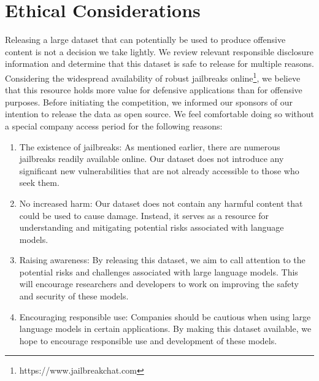 \section*{Ethical Considerations}
 \label{sec:ethics}
Releasing a large dataset that can potentially be used to produce offensive content is not a decision we take lightly. We review relevant responsible disclosure information \cite{kirichenko2020best, cencini2005software} and determine that this dataset is safe to release for multiple reasons. Considering the widespread availability of robust jailbreaks online\footnote{https://www.jailbreakchat.com}, we believe that this resource holds more value for defensive applications than for offensive purposes. Before initiating the competition, we informed our sponsors of our intention to release the data as open source. We feel comfortable doing so without a special company access period for the following reasons:
\begin{enumerate}
    \item The existence of jailbreaks: As mentioned earlier, there are numerous jailbreaks readily available online. Our dataset does not introduce any significant new vulnerabilities that are not already accessible to those who seek them.
    \item No increased harm: Our dataset does not contain any harmful content that could be used to cause damage. Instead, it serves as a resource for understanding and mitigating potential risks associated with language models.
    \item Raising awareness: By releasing this dataset, we aim to call attention to the potential risks and challenges associated with large language models. This will encourage researchers and developers to work on improving the safety and security of these models.
    \item Encouraging responsible use: Companies should be cautious when using large language models in certain applications. By making this dataset available, we hope to encourage responsible use and development of these models.

\end{enumerate}